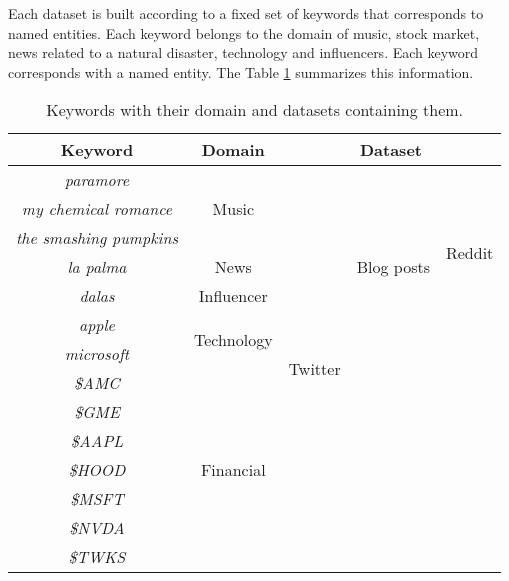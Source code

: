 Each dataset is built according to a fixed set of keywords that corresponds to named entities. Each keyword belongs to the domain of music, stock market, news related to a natural disaster, technology and influencers. Each keyword corresponds with a named entity. The Table \ref{table:keywords} summarizes this information.\\

\begin{table}[H]
	\centering
	\begin{tabular}{|c|c|c|c|c|}
		\hline
		\textbf{Keyword} & \textbf{Domain} & \multicolumn{3}{c|}{\textbf{Dataset}} \bigstrut\\
		\hline \hline
		\textit{paramore} & \multirow{3}[6]{*}{Music} & \multirow{14}[28]{*}{Twitter} & \multirow{7}[14]{*}{Blog posts} & \multirow{6}[12]{*}{Reddit} \bigstrut\\
		\cline{1-1}    \textit{my chemical romance} &       &       &       &  \bigstrut\\
		\cline{1-1}    \textit{the smashing pumpkins} &       &       &       &  \bigstrut\\
		\cline{1-2}    \textit{la palma} & News  &       &       &  \bigstrut\\
		\cline{1-2}    \textit{dalas} & Influencer &       &       &  \bigstrut\\
		\cline{1-2}    \textit{apple} & \multirow{2}[4]{*}{Technology} &       &       &  \bigstrut\\
		\cline{1-1}\cline{5-5}    \textit{microsoft} &       &       &       & \multirow{8}[16]{*}{} \bigstrut\\
		\cline{1-2}\cline{4-4}    \textit{\$AMC} & \multirow{7}[14]{*}{Financial} &       & \multirow{7}[14]{*}{} &  \bigstrut\\
		\cline{1-1}    \textit{\$GME} &       &       &       &  \bigstrut\\
		\cline{1-1}    \textit{\$AAPL} &       &       &       &  \bigstrut\\
		\cline{1-1}    \textit{\$HOOD} &       &       &       &  \bigstrut\\
		\cline{1-1}    \textit{\$MSFT} &       &       &       &  \bigstrut\\
		\cline{1-1}    \textit{\$NVDA} &       &       &       &  \bigstrut\\
		\cline{1-1}    \textit{\$TWKS} &       &       &       &  \bigstrut\\
		\hline
	\end{tabular}%
	\caption{Keywords with their domain and datasets containing them.}
	\label{table:keywords}%
\end{table}%
